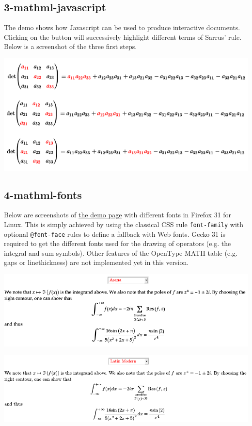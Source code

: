 \subsection{3-mathml-javascript}

The demo shows how Javascript can be used to produce interactive documents.
Clicking on the button will successively highlight different terms of Sarrus'
rule. Below is a screenshot of the three first steps.

\href{http://fred-wang.github.io/MathUI2014/demos/3-mathml-javascript.html}{\includegraphics{screenshots/3-mathml-javascript}}

\subsection{4-mathml-fonts}

Below are screenshots of 
\href{http://fred-wang.github.io/MathUI2014/demos/4-mathml-fonts.html}{the demo page} with different fonts in Firefox 31 for Linux.
This is simply achieved by
using the classical CSS rule {\tt font-family} with optional {\tt @font-face}
rules to define a fallback with Web fonts. Gecko 31 is required to get the
different fonts used for the drawing of operators (e.g. the integral and
sum symbols). Other features of the OpenType MATH table (e.g. gaps or
linethickness) are not implemented yet in this version.

\includegraphics[width=\textwidth]{screenshots/4-mathml-fonts-asana}

\includegraphics[width=\textwidth]{screenshots/4-mathml-fonts-latin-modern}

